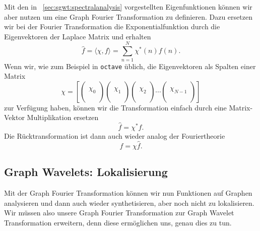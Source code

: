 Mit den in ~\cref{sec:sgwt:spectralanalysis} vorgestellten Eigenfunktionen 
k\"onnen wir aber nutzen um eine Graph Fourier Transformation zu definieren. 
Dazu ersetzen wir bei der Fourier Transformation die Exponentialfunktion durch 
die Eigenvektoren der Laplace Matrix und erhalten
\begin{equation*}
\hat{f} = \langle \chi, f \rangle = \sum_{n = 1}^{N} \chi^*(n)f(n).
\end{equation*}
Wenn wir, wie zum Beispiel in \texttt{octave} \"ublich, die Eigenvektoren als 
Spalten einer Matrix
\begin{equation}
\chi = 
\left[
\begin{pmatrix}\\\chi_0\\\\\end{pmatrix}
\begin{pmatrix}\\\chi_1\\\\\end{pmatrix}
\begin{pmatrix}\\\chi_2\\\\\end{pmatrix}
\cdots
\begin{pmatrix}\\\chi_{N-1}\\\\\end{pmatrix}
\right]
\end{equation}
zur Verf\"ugung haben, k\"onnen wir die Transformation 
einfach durch eine Matrix-Vektor Multiplikation ersetzen
\begin{equation*}
\hat{f} = \chi^* f.
\end{equation*}
Die R\"ucktransformation ist dann auch wieder analog der Fouriertheorie
\begin{equation*}
f = \chi \hat{f}.
\end{equation*}

\subsection{Graph Wavelets: Lokalisierung\label{subsec:sgwt:gwt:localizing}}

Mit der Graph Fourier Transformation k\"onnen wir nun Funktionen auf Graphen 
analysieren und dann auch wieder synthetisieren, aber noch nicht zu 
lokalisieren. Wir m\"ussen also unsere Graph Fourier Transformation zur Graph 
Wavelet Transformation erweitern, denn diese erm\"oglichen uns, genau dies zu 
tun.

